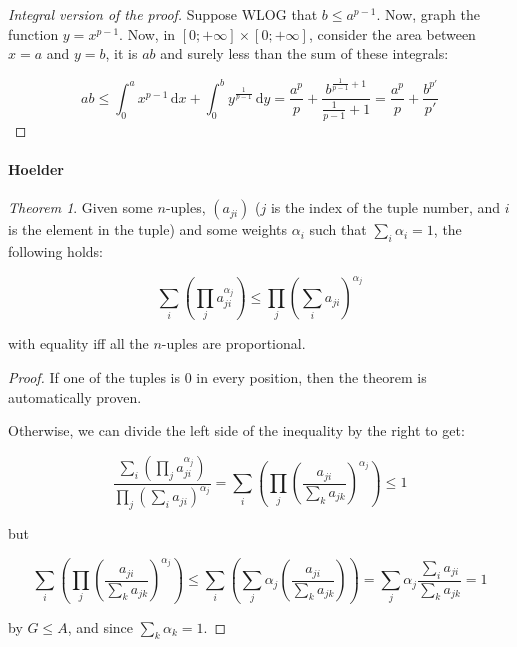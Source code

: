 \documentclass[12pt,a4paper]{report}
\numberwithin{equation}{section}
\theoremstyle{definition}
\theoremstyle{remark}
\newtheorem{theorem}{Theorem}[section]
\begin{document}
\begin{proof}[Integral version of the proof]
Suppose WLOG that $b\leq a^{p-1}$. Now, graph the function $y = x^{p-1}$. Now, in $[0; +\infty] \times [0; +\infty]$, consider the area between $x=a$ and $y=b$, it is $ab$ and surely less than the sum of these integrals:

\begin{equation}
ab \leq \int^{a}_{0} x^{p-1} \, \text{d}x + \int^{b}_{0} y^{\frac{1}{p-1}} \, \text{d} y = \frac{a^p}{p} + \frac{b^{\frac{1}{p-1} +1}}{\frac{1}{p-1} +1} = \frac{a^p}{p} + \frac{b^{p'}}{p'}
\end{equation}
\end{proof}

\paragraph{Hoelder}

\begin{theorem}
Given some $n$-uples, $(a_{ji})$ ($j$ is the index of the tuple number, and $i$ is the element in the tuple) and some weights $\alpha_i$ such that $\sum_i \alpha_i = 1$, the following holds:

\begin{equation}
\sum_i \left( \prod_j a_{ji}^{\alpha_j}\right) \leq \prod_j \left(
\sum _i a_{ji} 
\right)^{\alpha_j}
\end{equation}

with equality iff all the $n$-uples are proportional.
\end{theorem}

\begin{proof}
If one of the tuples is 0 in every position, then the theorem is automatically proven.

Otherwise, we can divide the left side of the inequality by the right to get:

\begin{equation}
\frac{\displaystyle
\sum_i \left(
\prod_j a_{ji}^{\alpha_j}
\right)
}{\displaystyle
\prod_j
\left(
\sum_i a_{ji}
\right)^{\alpha_j}
}
=
\sum_i
\left(
\prod_j
\left(
\frac{
a_{ji}
}{
\sum_k a_{jk}
}
\right)^{\alpha_j}
\right)\leq 1
\end{equation}

but 

\begin{equation}
\sum_i
\left(
\prod_j
\left(
\frac{
a_{ji}
}{
\sum_k a_{jk}
}
\right)^{\alpha_j}
\right)\leq
\sum_i
\left(
\sum_j \alpha_j \left(
\frac{a_{ji}}{\sum_k a_{jk}}
\right)
\right) =
\sum_j \alpha_j
\frac{\sum_i a_{ji}}{\sum_k a_{jk}}
=1
\end{equation}

by $G\leq A$, and since $\sum_k \alpha_k = 1$.
\end{proof}
\end{document}

